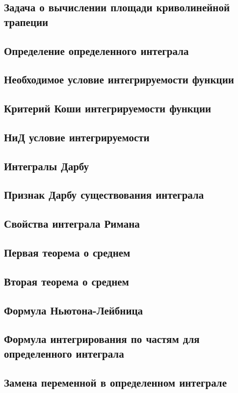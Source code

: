 \subsection{Задача о вычислении площади криволинейной трапеции}
\subsection{Определение определенного интеграла}
\subsection{Необходимое условие интегрируемости функции}
\subsection{Критерий Коши интегрируемости функции}
\subsection{НиД условие интегрируемости}
\subsection{Интегралы Дарбу}
\subsection{Признак Дарбу существования интеграла}
\subsection{Свойства интеграла Римана}
\subsection{Первая теорема о среднем}
\subsection{Вторая теорема о среднем} 
\subsection{Формула Ньютона-Лейбница}
\subsection{Формула интегрирования по частям для определенного интеграла}
\subsection{Замена переменной в определенном интеграле}
